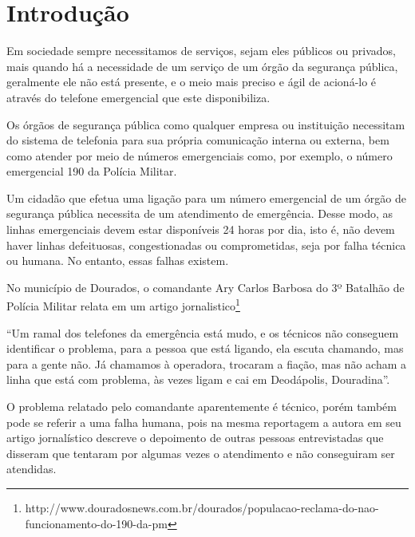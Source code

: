 
\chapter{Introdução}%
Em sociedade sempre necessitamos de serviços, sejam eles públicos ou privados, mais quando há a necessidade de um serviço de um órgão da segurança pública, geralmente ele não está presente, e o meio mais preciso e ágil de acioná-lo é através do telefone emergencial que este disponibiliza.

Os órgãos de segurança pública como qualquer empresa ou instituição necessitam do sistema de telefonia para sua própria comunicação interna ou externa, bem como atender por meio de números emergenciais como, por exemplo, o número emergencial 190 da Polícia Militar.

Um cidadão que efetua uma ligação para um número emergencial de um órgão de segurança pública necessita de um atendimento de emergência. Desse modo, as linhas emergenciais devem estar disponíveis 24 horas por dia, isto é, não devem haver linhas defeituosas, congestionadas ou comprometidas, seja por falha técnica ou humana. No entanto, essas falhas existem.

No município de Dourados, o comandante Ary Carlos Barbosa do 3º Batalhão de Polícia Militar relata em um artigo jornalistico\footnote{http://www.douradosnews.com.br/dourados/populacao-reclama-do-nao-funcionamento-do-190-da-pm}

\begin{citacao}
``Um ramal dos telefones da emergência está mudo, e os técnicos não conseguem identificar o problema, para a pessoa que está ligando, ela escuta chamando, mas para a gente não. Já chamamos à operadora, trocaram a fiação, mas não acham a linha que está com problema, às vezes ligam e cai em Deodápolis, Douradina''.
\end{citacao}

O problema relatado pelo comandante aparentemente é técnico, porém também pode se referir a uma falha humana, pois na mesma reportagem a autora  em seu artigo jornalístico descreve o depoimento de outras pessoas entrevistadas que disseram que tentaram por algumas vezes o atendimento e não conseguiram ser atendidas.

